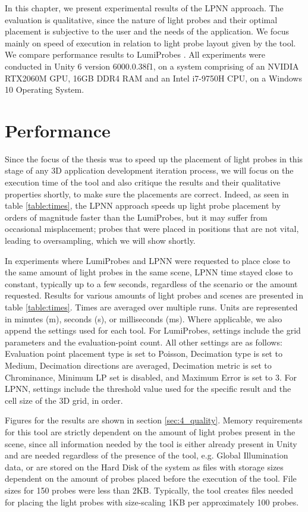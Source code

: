 In this chapter, we present experimental results of the LPNN approach. The evaluation is qualitative, since the nature of light probes and their optimal placement is subjective to the user and the needs of the application. We focus mainly on speed of execution in relation to light probe layout given by the tool. We compare performance results to LumiProbes \parencite{Vardis2021}. All experiments were conducted in Unity 6 version 6000.0.38f1, on a system comprising of an NVIDIA RTX2060M GPU, 16GB DDR4 RAM and an Intel i7-9750H CPU, on a Windows 10 Operating System.

\section{Performance}
\label{sec:4_performance}
Since the focus of the thesis was to speed up the placement of light probes in this stage of any 3D application development iteration process, we will focus on the execution time of the tool and also critique the results and their qualitative properties shortly, to make sure the placements are correct. Indeed, as seen in table \ref{table:times}, the LPNN approach speeds up light probe placement by orders of magnitude faster than the LumiProbes, but it may suffer from occasional misplacement; probes that were placed in positions that are not vital, leading to oversampling, which we will show shortly. 

In experiments where LumiProbes and LPNN were requested to place close to the same amount of light probes in the same scene, LPNN time stayed close to constant, typically up to a few seconds, regardless of the scenario or the amount requested. Results for various amounts of light probes and scenes are presented in table \ref{table:times}. Times are averaged over multiple runs. Units are represented in minutes (m), seconds (s), or milliseconds (ms). Where applicable, we also append the settings used for each tool. For LumiProbes, settings include the grid parameters and the evaluation-point count. All other settings are as follows: Evaluation point placement type is set to Poisson, Decimation type is set to Medium, Decimation directions are averaged, Decimation metric is set to  Chrominance, Minimum LP set is disabled, and Maximum Error is set to 3. For LPNN, settings include the threshold value used for the specific result and the cell size of the 3D grid, in order.\newline

Figures for the results are shown in section \ref{sec:4_quality}. Memory requirements for this tool are strictly dependent on the amount of light probes present in the scene, since all information needed by the tool is either already present in Unity and are needed regardless of the presence of the tool, e.g. Global Illumination data, or are stored on the Hard Disk of the system as files with storage sizes dependent on the amount of probes placed before the execution of the tool. File sizes for 150 probes were less than 2KB. Typically, the tool creates files needed for placing the light probes with size-scaling 1KB per approximately 100 probes.


